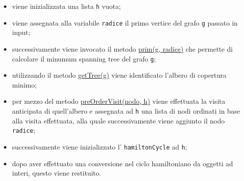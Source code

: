 \begin{itemize}
    \item viene inizializzata una lista \texttt{h} vuota;
    \item viene assegnata alla variabile \texttt{radice} il primo vertice del grafo \texttt{g} passato in input;
    \item successivamente viene invocato il metodo \hyperlink{prim}{prim(g, radice)} che permette di calcolare il minumum spanning tree del grafo \texttt{g};
    \item utilizzando il metodo \hyperlink{getTree}{getTree(g)} viene identificato l'albero di copertura minimo;
    \item per mezzo del metodo \hyperlink{preOrderVisit}{preOrderVisit(nodo, h)} viene effettuata la visita anticipata di quell'albero e assegnata ad \texttt{h} una lista di nodi ordinati in base alla visita effettuata, alla quale successivamente viene aggiunto il nodo \texttt{radice};
    \item successivamente viene inizializzato l' \texttt{hamiltonCycle} ad \texttt{h};
    \item dopo aver effettuato una conversione nel ciclo hamiltoniano da oggetti ad interi, questo viene restituito.
\end{itemize}
